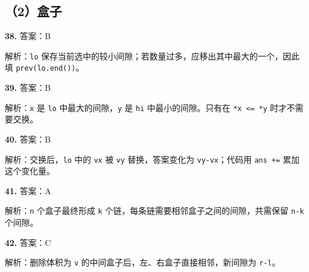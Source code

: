 \documentclass[a4paper]{ctexart}
\newcommand{\ans}[2]{\noindent\textbf{#1} \quad 答案：#2\par}
\newcommand{\expn}[1]{\hspace*{1.5em}解析：#1\par}
\begin{document}
\subsection*{（2）盒子}
\ans{38.}{B}\expn{\texttt{lo} 保存当前选中的较小间隙；若数量过多，应移出其中最大的一个，因此填 \texttt{prev(lo.end())}。}
\ans{39.}{B}\expn{\texttt{x} 是 \texttt{lo} 中最大的间隙，\texttt{y} 是 \texttt{hi} 中最小的间隙。只有在 \texttt{*x <= *y} 时才不需要交换。}
\ans{40.}{B}\expn{交换后，\texttt{lo} 中的 \texttt{vx} 被 \texttt{vy} 替换，答案变化为 \texttt{vy-vx}；代码用 \texttt{ans +=} 累加这个变化量。}
\ans{41.}{A}\expn{\texttt{n} 个盒子最终形成 \texttt{k} 个链，每条链需要相邻盒子之间的间隙，共需保留 \texttt{n-k} 个间隙。}
\ans{42.}{C}\expn{删除体积为 \texttt{v} 的中间盒子后，左、右盒子直接相邻，新间隙为 \texttt{r-l}。}
\end{document}
